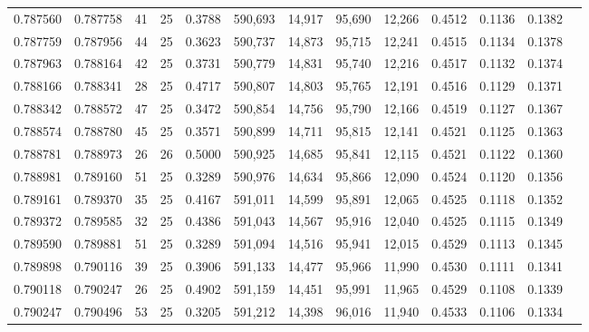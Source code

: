 \begin{tabular}{rrrrrrrrrrrrr}
0.787560 & 0.787758 &    41 &  25 &                                     0.3788 & 590,693 &  14,917 &  95,690 &  12,266 & 0.4512 & 0.1136 & 0.1382 \\
0.787759 & 0.787956 &    44 &  25 &                                     0.3623 & 590,737 &  14,873 &  95,715 &  12,241 & 0.4515 & 0.1134 & 0.1378 \\
0.787963 & 0.788164 &    42 &  25 &                                     0.3731 & 590,779 &  14,831 &  95,740 &  12,216 & 0.4517 & 0.1132 & 0.1374 \\
0.788166 & 0.788341 &    28 &  25 &                                     0.4717 & 590,807 &  14,803 &  95,765 &  12,191 & 0.4516 & 0.1129 & 0.1371 \\
0.788342 & 0.788572 &    47 &  25 &                                     0.3472 & 590,854 &  14,756 &  95,790 &  12,166 & 0.4519 & 0.1127 & 0.1367 \\
0.788574 & 0.788780 &    45 &  25 &                                     0.3571 & 590,899 &  14,711 &  95,815 &  12,141 & 0.4521 & 0.1125 & 0.1363 \\
0.788781 & 0.788973 &    26 &  26 &                                     0.5000 & 590,925 &  14,685 &  95,841 &  12,115 & 0.4521 & 0.1122 & 0.1360 \\
0.788981 & 0.789160 &    51 &  25 &                                     0.3289 & 590,976 &  14,634 &  95,866 &  12,090 & 0.4524 & 0.1120 & 0.1356 \\
0.789161 & 0.789370 &    35 &  25 &                                     0.4167 & 591,011 &  14,599 &  95,891 &  12,065 & 0.4525 & 0.1118 & 0.1352 \\
0.789372 & 0.789585 &    32 &  25 &                                     0.4386 & 591,043 &  14,567 &  95,916 &  12,040 & 0.4525 & 0.1115 & 0.1349 \\
0.789590 & 0.789881 &    51 &  25 &                                     0.3289 & 591,094 &  14,516 &  95,941 &  12,015 & 0.4529 & 0.1113 & 0.1345 \\
0.789898 & 0.790116 &    39 &  25 &                                     0.3906 & 591,133 &  14,477 &  95,966 &  11,990 & 0.4530 & 0.1111 & 0.1341 \\
0.790118 & 0.790247 &    26 &  25 &                                     0.4902 & 591,159 &  14,451 &  95,991 &  11,965 & 0.4529 & 0.1108 & 0.1339 \\
0.790247 & 0.790496 &    53 &  25 &                                     0.3205 & 591,212 &  14,398 &  96,016 &  11,940 & 0.4533 & 0.1106 & 0.1334 \\

\end{tabular}

